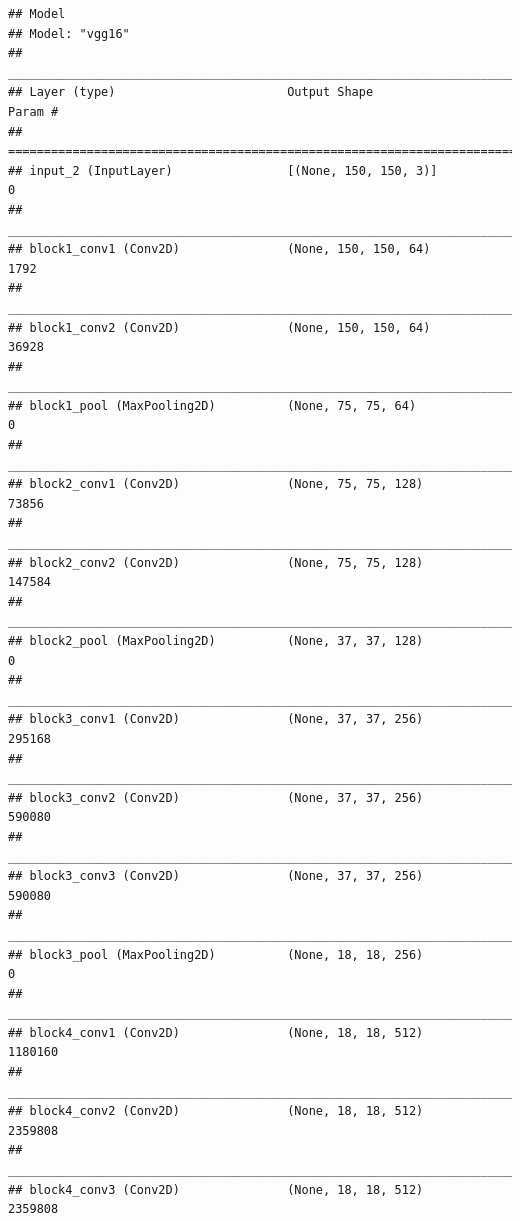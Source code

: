 \documentclass[]{book}
\begin{document}
\begin{verbatim}
## Model
## Model: "vgg16"
## ________________________________________________________________________________
## Layer (type)                        Output Shape                    Param #     
## ================================================================================
## input_2 (InputLayer)                [(None, 150, 150, 3)]           0           
## ________________________________________________________________________________
## block1_conv1 (Conv2D)               (None, 150, 150, 64)            1792        
## ________________________________________________________________________________
## block1_conv2 (Conv2D)               (None, 150, 150, 64)            36928       
## ________________________________________________________________________________
## block1_pool (MaxPooling2D)          (None, 75, 75, 64)              0           
## ________________________________________________________________________________
## block2_conv1 (Conv2D)               (None, 75, 75, 128)             73856       
## ________________________________________________________________________________
## block2_conv2 (Conv2D)               (None, 75, 75, 128)             147584      
## ________________________________________________________________________________
## block2_pool (MaxPooling2D)          (None, 37, 37, 128)             0           
## ________________________________________________________________________________
## block3_conv1 (Conv2D)               (None, 37, 37, 256)             295168      
## ________________________________________________________________________________
## block3_conv2 (Conv2D)               (None, 37, 37, 256)             590080      
## ________________________________________________________________________________
## block3_conv3 (Conv2D)               (None, 37, 37, 256)             590080      
## ________________________________________________________________________________
## block3_pool (MaxPooling2D)          (None, 18, 18, 256)             0           
## ________________________________________________________________________________
## block4_conv1 (Conv2D)               (None, 18, 18, 512)             1180160     
## ________________________________________________________________________________
## block4_conv2 (Conv2D)               (None, 18, 18, 512)             2359808     
## ________________________________________________________________________________
## block4_conv3 (Conv2D)               (None, 18, 18, 512)             2359808     

\end{verbatim}
\end{document}
